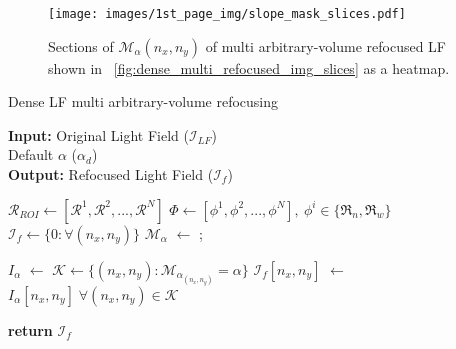 \begin{figure}[!h]
    \centering
    \texttt{[image: images/1st\_page\_img/slope\_mask\_slices.pdf]}
    \caption{Sections of $\mathcal{M}_{\alpha}(n_x,n_y)$ of multi arbitrary-volume refocused LF shown in \figurename~\ref{fig:dense_multi_refocused_img_slices} as a heatmap.}
    \label{fig:alpha_mask}
\end{figure}


\begin{algorithm}[!h]
\scriptsize
\caption{Dense LF multi arbitrary-volume refocusing}\label{alg:dense_LF_refocus}

\hspace*{\algorithmicindent} \textbf{Input:} Original Light Field ($\mathcal{I}_{LF}$) \\
\hspace*{\algorithmicindent} \hspace{.9cm} Default $\alpha$ ($\alpha_d$)\\ 
\hspace*{\algorithmicindent} \textbf{Output:} Refocused Light Field ($\mathcal{I}_f$)
\begin{algorithmic}[1]
    \State $\mathcal{R}_{ROI} \gets  [\mathcal{R}^1, \mathcal{R}^2, ..., \mathcal{R}^N]$
    \State $\Phi \gets [\phi^1, \phi^2, ..., \phi^N],~\phi^i \in \{\mathfrak{R}_{n}, \mathfrak{R}_{w}\}$
    \State $\mathcal{I}_f \gets \{0:\forall(n_x,n_y)\}$ 
    \State $\mathcal{M}_{\alpha}$ $\gets$ ;
    
        \State $I_{\alpha}$ $\gets$  \Comment{~\eqref{eq:LF_refocus_simple}}
        \State $\mathcal{K} \gets \{(n_x,n_y):\mathcal{M}_{{\alpha}_{(n_x,n_y)}}=\alpha\}$
        \State $\mathcal{I}_f[n_x,n_y]$ $\gets$ $I_{\alpha}[n_x,n_y] \;\forall(n_x,n_y)\in\mathcal{K}$

    \EndFor
    \State \textbf{return} $\mathcal{I}_f$
\EndProcedure




\end{algorithmic}
\end{algorithm}
